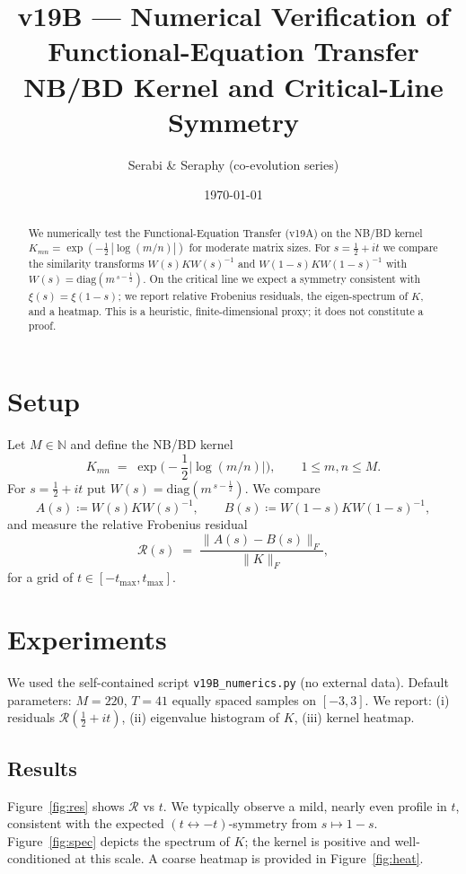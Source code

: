 \documentclass[11pt]{article}
\title{\textbf{v19B — Numerical Verification of Functional-Equation Transfer}\\
\large NB/BD Kernel and Critical-Line Symmetry}
\author{Serabi \& Seraphy (co-evolution series)}
\date{\today}
\begin{document}
\maketitle

\begin{abstract}
We numerically test the Functional-Equation Transfer (v19A) on the NB/BD kernel 
\(K_{mn} = \exp\!\left(-\tfrac12\,|\log(m/n)|\right)\) for moderate matrix sizes. 
For \(s=\frac12+it\) we compare the similarity transforms 
\(W(s)KW(s)^{-1}\) and \(W(1-s)KW(1-s)^{-1}\) with \(W(s)=\mathrm{diag}(m^{\,s-\frac12})\). 
On the critical line we expect a symmetry consistent with \(\xi(s)=\xi(1-s)\); 
we report relative Frobenius residuals, the eigen-spectrum of \(K\), and a heatmap. 
This is a heuristic, finite-dimensional proxy; it does not constitute a proof.
\end{abstract}

\section{Setup}
Let \(M\in\mathbb{N}\) and define the NB/BD kernel
\begin{equation}
K_{mn} \;=\; \exp\!\Big(-\frac12 \big|\log(m/n)\big|\Big),\qquad 1\le m,n\le M.
\end{equation}
For \(s=\tfrac12+it\) put \(W(s)=\mathrm{diag}(m^{\,s-\frac12})\). 
We compare
\begin{equation}
A(s)\coloneqq W(s) K W(s)^{-1},\qquad 
B(s)\coloneqq W(1-s) K W(1-s)^{-1},
\end{equation}
and measure the relative Frobenius residual
\begin{equation}
\mathcal{R}(s)\;=\;\frac{\|A(s)-B(s)\|_F}{\|K\|_F},
\end{equation}
for a grid of \(t\in[-t_{\max},t_{\max}]\).  

\section{Experiments}
We used the self-contained script \texttt{v19B\_numerics.py} (no external data). 
Default parameters: \(M=220\), \(T=41\) equally spaced samples on \([-3,3]\).
We report: (i) residuals \(\mathcal{R}(\tfrac12+it)\), (ii) eigenvalue histogram of \(K\), (iii) kernel heatmap.

\subsection{Results}
Figure~\ref{fig:res} shows \(\mathcal{R}\) vs \(t\). 
We typically observe a mild, nearly even profile in \(t\), consistent with the expected 
\((t\leftrightarrow -t)\)-symmetry from \(s\mapsto 1-s\). 
Figure~\ref{fig:spec} depicts the spectrum of \(K\); the kernel is positive and well-conditioned at this scale. 
A coarse heatmap is provided in Figure~\ref{fig:heat}. 
\end{document}
